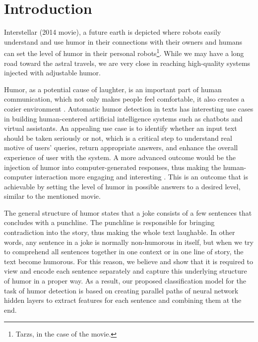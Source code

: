 \documentclass[journal]{IEEEtran}
\begin{document}
\IEEEpeerreviewmaketitle



\section{Introduction}

  Interstellar (2014 movie), a future earth is depicted where robots easily understand and use humor in their connections with their owners and humans can set the level of humor in their personal robots\footnote{Tarzs, in the case of the movie.}. While we may have a long road toward the astral travels, we are very close in reaching high-quality systems injected with adjustable humor. 

Humor, as a potential cause of laughter, is an important part of human communication, which not only makes people feel comfortable, it also creates a cozier environment \cite{castro2016joke}. Automatic humor detection in texts has interesting use cases in building human-centered artificial intelligence systems such as chatbots and virtual assistants. An appealing use case \cite{castro2016joke} is to identify whether an input text should be taken seriously or not, which is a critical step to understand real motive of users' queries, return appropriate answers, and enhance the overall experience of user with the system. A more advanced outcome would be the injection of humor into computer-generated responses, thus making the human-computer interaction more engaging and interesting \cite{niculescu2013making}. This is an outcome that is achievable by setting the level of humor in possible answers to a desired level, similar to the mentioned movie.

The general structure of humor states that a joke consists of a few sentences that concludes with a punchline. The punchline is responsible for bringing contradiction into the story, thus making the whole text laughable. In other words, any sentence in a joke is normally non-humorous in itself, but when we try to comprehend all sentences together in one context or in one line of story, the text become humorous. For this reason, we believe and show that it is required to view and encode each sentence separately and capture this underlying structure of humor in a proper way. As a result, our proposed classification model for the task of humor detection is based on creating parallel paths of neural network hidden layers to extract features for each sentence and combining them at the end. 
\end{document}
